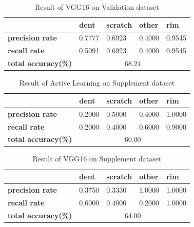 \documentclass[lang=english,inputenc=utf8,fontsize=10pt]{ldvarticle}
\begin{document}
\begin{table}[H]   
    \begin{center}   
    \caption{Result of VGG16 on Validation dataset}  
    \label{VGG16 V} 
    \begin{tabular}{|m{2cm}<{\centering}|m{2cm}<{\centering}|m{2.0cm}<{\centering}|m{2cm}<{\centering}|m{2cm}<{\centering}|}   
    \hline   &\textbf{dent} & \textbf{scratch} & \textbf{other} & \textbf{rim}\\ 
    \hline   \textbf{precision rate}  & 0.7777 & 0.6923 & 0.4000 & 0.9545  \\ 
    \hline   \textbf{recall rate} & 0.5091 & 0.6923 & 0.4000 & 0.9545   \\  
    \hline   \textbf{total accuracy(\%)} & \multicolumn{4}{|c|}{68.24} \\  
    \hline 
    \end{tabular}   
    \end{center}   
\end{table}

\begin{table}[H]   
    \begin{center}   
    \caption{Result of Active Learning on Supplement dataset}  
    \label{Active s} 
    \begin{tabular}{|m{2cm}<{\centering}|m{2cm}<{\centering}|m{2.0cm}<{\centering}|m{2cm}<{\centering}|m{2cm}<{\centering}|}   
    \hline   &\textbf{dent} & \textbf{scratch} & \textbf{other} & \textbf{rim}\\ 
    \hline   \textbf{precision rate}  & 0.2000 & 0.5000 & 0.4000 & 1.0000  \\ 
    \hline   \textbf{recall rate} & 0.2000 & 0.4000 & 0.6000 & 0.9000   \\  
    \hline   \textbf{total accuracy(\%)} & \multicolumn{4}{|c|}{60.00} \\  
    \hline 
    \end{tabular}   
    \end{center}   
\end{table}

\begin{table}[H]   
    \begin{center}   
    \caption{Result of VGG16 on Supplement dataset}  
    \label{VGG16 s} 
    \begin{tabular}{|m{2cm}<{\centering}|m{2cm}<{\centering}|m{2.0cm}<{\centering}|m{2cm}<{\centering}|m{2cm}<{\centering}|}   
    \hline   &\textbf{dent} & \textbf{scratch} & \textbf{other} & \textbf{rim}\\ 
    \hline   \textbf{precision rate}  & 0.3750 & 0.3330 & 1.0000 & 1.0000  \\ 
    \hline   \textbf{recall rate} & 0.6000 & 0.4000 & 0.2000 & 1.0000   \\  
    \hline   \textbf{total accuracy(\%)} & \multicolumn{4}{|c|}{64.00} \\  
    \hline 
    \end{tabular}   
    \end{center}   
\end{table}
\end{document}
